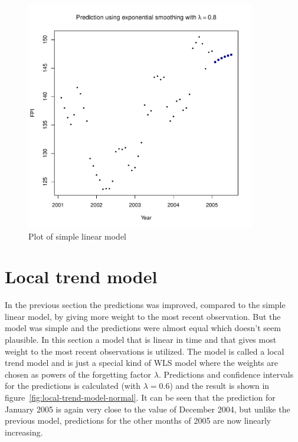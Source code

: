 \documentclass[11pt]{article}
\begin{document}
\begin{figure}
    \centering
    \includegraphics[width=100mm]{exp-smoothing-lambda-8.pdf}
    \caption{Plot of simple linear model}
    \label{fig:local-constant-8}
\end{figure}

\pagebreak

\section*{Local trend model}
In the previous section the predictions was improved, compared to the simple linear model, by giving more weight to the most recent observation. But the model was simple and the predictions were almost equal which doesn't seem plausible. In this section a model that is linear in time and that gives most weight to the most recent observations is utilized. The model is called a local trend model and is just a special kind of WLS model where the weights are chosen as powers of the forgetting factor $\lambda$. Predictions and confidence intervals for the predictions is calculated (with $\lambda=0.6$) and the result is shown in figure~\ref{fig:local-trend-model-normal}. It can be seen that the prediction for January 2005 is again very close to the value of December 2004, but unlike the previous model, predictions for the other months of 2005 are now linearly increasing. 
\end{document}
